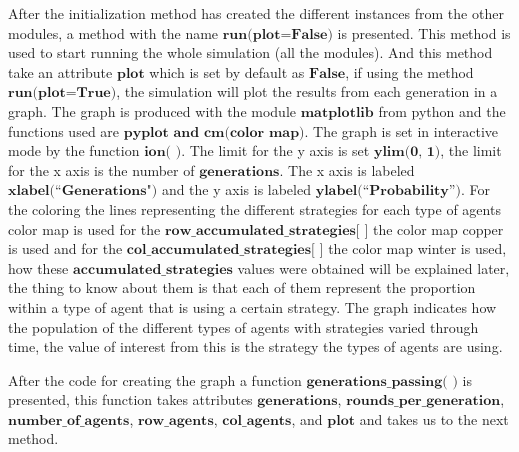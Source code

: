 \documentclass{article}
\begin{document}
After the initialization method has created the different instances from the other modules, a method with the name $\textbf{run(plot=False)}$ is presented. This method is used to start running the whole simulation (all the modules). And this method take an attribute $\textbf{plot}$ which is set by default as $\textbf{False}$, if using the method $\textbf{run(plot=True)}$, the simulation will plot the results from each generation in a graph. The graph is produced with the module $\textbf{matplotlib}$ from python and the functions used are $\textbf{pyplot and cm(color map)}$. The graph is set in interactive mode by the function $\textbf{ion( )}$. The limit for the y axis is set $\textbf{ylim(0, 1)}$, the limit for the x axis is the number of $\textbf{generations}$. The x axis is labeled $\textbf{xlabel(``Generations")}$ and the y axis is labeled $\textbf{ylabel(``Probability'')}$. For the coloring the lines representing the different strategies for each type of agents color map is used for the $\textbf{row\_accumulated\_strategies[ ]}$ the color map copper is used and for the $\textbf{col\_accumulated\_strategies[ ]}$ the color map winter is used, how these $\textbf{accumulated\_strategies}$ values were obtained will be explained later, the thing to know about them is that each of them represent the proportion within a type of agent that is using a certain strategy. The graph indicates how the population of the different types of agents with strategies varied through time, the value of interest from this is the strategy the types of agents are using.

After the code for creating the graph a function $\textbf{generations\_passing( )}$ is presented, this function takes attributes $\textbf{generations}$, $\textbf{rounds\_per\_generation}$, $\textbf{number\_of\_agents}$, $\textbf{row\_agents}$, $\textbf{col\_agents}$, and $\textbf{plot}$ and takes us to the next method.
\end{document}
